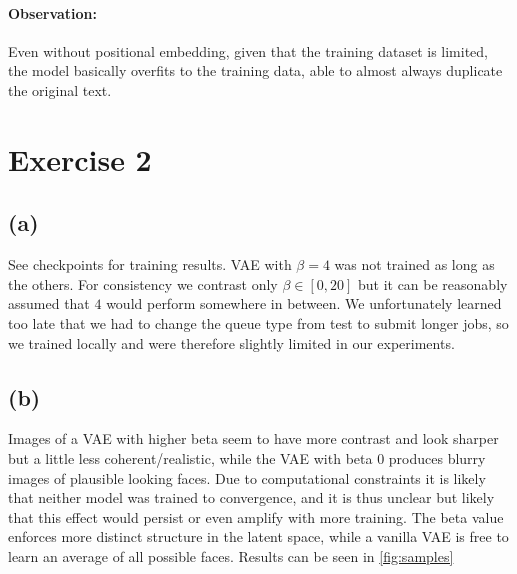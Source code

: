 \documentclass[11pt]{article}
\numberwithin{equation}{section}
\begin{document}
\paragraph{Observation:} Even without positional embedding, given that the training dataset is
limited, the model basically overfits to the training data, able to almost always
duplicate the original text.


\section*{Exercise 2}

\subsection{(a)}
See checkpoints for training results. 
VAE with $\beta =4$ was not trained as long as the others. For consistency we contrast only $\beta \in [0,20]$ but it can be reasonably assumed that $4$ would perform somewhere in between.
We unfortunately learned too late that we had to change the queue type from test to submit longer jobs, so we trained locally and were therefore slightly limited in our experiments.
\newpage
\subsection{(b)}

Images of a VAE with higher beta seem to have more contrast and look sharper but a
little less coherent/realistic, while the VAE with beta 0 produces blurry images
of plausible looking faces. Due to computational constraints it is likely that
neither model was trained to convergence, and it is thus unclear but likely that
this effect would persist or even amplify with more training. The beta value
enforces more distinct structure in the latent space, while a vanilla VAE is free
to learn an average of all possible faces.
Results can be seen in \ref{fig:samples}
\end{document}
